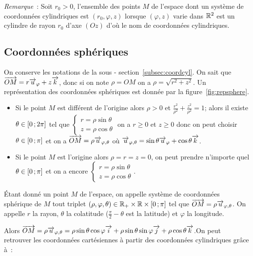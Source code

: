 \emph{Remarque}~: Soit \(r_0>0\), l'ensemble des points \(M\) de l'espace dont 
un système de coordonnées cylindriques est \((r_0, \varphi, z)\) lorsque 
\((\varphi, z)\) varie dans \(\mathbb{R}^2\) est un cylindre de rayon \(r_0\) d'axe 
\((Oz)\) d'où le nom de coordonnées cylindriques.

\subsection{Coordonnées sphériques}
On conserve les notations de la sous - section~\ref{subsec:coordcyl}. On sait 
que \(\overrightarrow{OM}=r\overrightarrow{u}_\varphi + z\overrightarrow{k}\), donc si on note \(\rho = OM\) on a \(\rho 
= \sqrt{r^2 + z^2}\). Un représentation des coordonnées sphériques est donnée 
par la figure~\ref{fig:repsphere}.

\begin{itemize}
  \item Si le point \(M\) est différent de l'origine alors \(\rho>0\) et 
    \(\frac{r^2}{\rho^2}+\frac{z^2}{\rho^2}=1\); alors il existe \(\theta\in 
    \left[ 0 \, ;  2\pi \right]\) tel que \(\begin{cases} r = \rho\sin\theta \\ z = 
    \rho\cos\theta \end{cases}\) on a \(r\geqslant 0\) et \(z\geqslant 0\) donc 
    on peut choisir \(\theta\in \left[ 0 \, ;  \pi \right]\) et on a
    \(\overrightarrow{OM}=\rho\overrightarrow{u}_{\varphi, \theta}\) où \(\overrightarrow{u}_{\varphi, 
    \theta}=\sin\theta\overrightarrow{u}_\varphi + \cos\theta\overrightarrow{k}\).
  \item Si le point \(M\) est l'origine alors \(\rho = r=z = 0\), on peut 
    prendre n'importe quel \(\theta \in \left[ 0 \, ;  \pi \right]\) et on a encore 
    \(\begin{cases} r = \rho\sin\theta \\ z = \rho\cos\theta \end{cases}\).
\end{itemize}

\begin{defdef}
  Étant donné un point \(M\) de l'espace, on appelle système de coordonnées 
  sphérique de \(M\) tout triplet \((\rho, \varphi, \theta)\in\mathbb{R}_{+} \times \mathbb{R} 
  \times \left[ 0 \, ;  \pi \right]\) tel que \(\overrightarrow{OM}=\rho\overrightarrow{u}_{\varphi, 
  \theta}\).  On appelle \(r\) la rayon, \(\theta\) la colatitude 
  (\(\frac{\pi}{2}-\theta\) est la latitude) et \(\varphi\) la longitude.
\end{defdef}
Alors \(\overrightarrow{OM} = \rho\overrightarrow{u}_{\varphi, \theta} = \rho\sin\theta\cos\varphi\overrightarrow{i} + 
\rho\sin\theta\sin\varphi\overrightarrow{j} + \rho\cos\theta\overrightarrow{k}\).On peut retrouver les 
coordonnées cartésiennes à partir des coordonnées cylindriques grâce à~:

